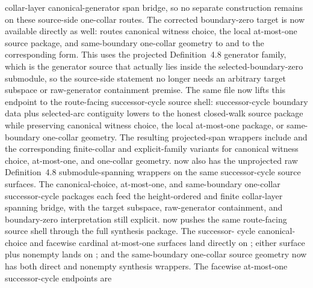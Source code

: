 \documentclass[11pt]{article}
\begin{document}
\begin{itemize}
collar-layer canonical-generator span bridge, so no separate
 construction remains on these
source-side one-collar routes.  The corrected boundary-zero target is now
available directly as well: 
routes canonical witness choice, the local at-most-one source package, and
same-boundary one-collar geometry to
and to the corresponding
form.  This uses the projected Definition~4.8 generator family, which is the
generator source that actually lies inside the selected-boundary-zero
submodule, so the source-side statement no longer needs an arbitrary target
subspace or raw-generator containment premise.  The same file now lifts this
endpoint to the route-facing successor-cycle source shell: successor-cycle
boundary data plus selected-arc contiguity lowers to the honest closed-walk
source package while preserving canonical witness choice, the local at-most-one
package, or same-boundary one-collar geometry.  The resulting projected-span
wrappers include
and the corresponding finite-collar and explicit-family variants for canonical
witness choice, at-most-one, and one-collar geometry.
 now also has the unprojected raw
Definition~4.8 submodule-spanning wrappers on the same successor-cycle source
surfaces.  The canonical-choice, at-most-one, and same-boundary one-collar
successor-cycle packages each feed the height-ordered and finite collar-layer
 spanning bridge, with the target subspace,
raw-generator containment, and boundary-zero interpretation still explicit.
 now pushes the same
route-facing source shell through the full synthesis package.  The successor-
cycle canonical-choice and facewise cardinal at-most-one surfaces land directly
on ; either surface plus nonempty
 lands on
; and the same-boundary
one-collar source geometry now has both direct and nonempty synthesis wrappers.
The facewise at-most-one successor-cycle endpoints are

\end{itemize}
\end{document}
